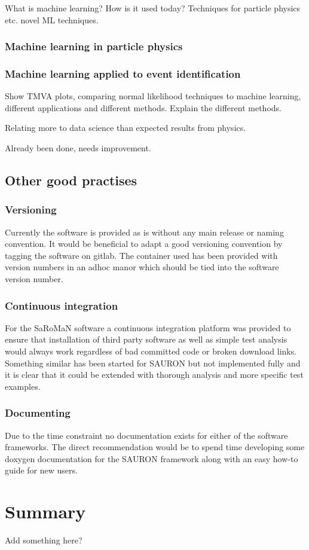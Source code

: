 What is machine learning? How is it used today? Techniques for particle physics etc. novel ML techniques.

\subsubsection{Machine learning in particle physics}

\subsubsection{Machine learning applied to event identification}

Show TMVA plots, comparing normal likelihood techniques to machine learning, different applications and different methods. Explain the different methods.

Relating more to data science than expected results from physics.

Already been done, needs improvement.

\subsection{Other good practises}

\subsubsection{Versioning}
Currently the software is provided as is without any main release or naming convention. It would be beneficial to adapt a good versioning convention by tagging the software on gitlab. The container used has been provided with version numbers in an adhoc manor which should be tied into the software version number.

\subsubsection{Continuous integration}
For the SaRoMaN software a continuous integration platform was provided to ensure that installation of third party software as well as simple test analysis would always work regardless of bad committed code or broken download links. Something similar has been started for SAURON but not implemented fully and it is clear that it could be extended with thorough analysis and more specific test examples.

\subsubsection{Documenting}
Due to the time constraint no documentation exists for either of the software frameworks. The direct recommendation would be to spend time developing some doxygen documentation for the SAURON framework along with an easy how-to guide for new users.

\section{Summary}
Add something here?
